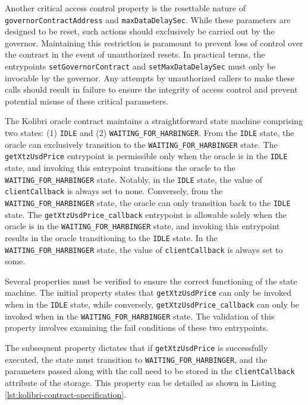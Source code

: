 \documentclass[a4paper,USenglish,cleveref, autoref, thm-restate]{lipics-v2021}
\begin{document}
Another critical access control property is the resettable nature of \lstinline/governorContractAddress/ and \lstinline/maxDataDelaySec/. While these parameters are designed to be reset, such actions should exclusively be carried out by the governor. Maintaining this restriction is paramount to prevent loss of control over the contract in the event of unauthorized resets. In practical terms, the entrypoints \lstinline/setGovernorContract/ and \lstinline/setMaxDataDelaySec/ must only be invocable by the governor. Any attempts by unauthorized callers to make these calls should result in failure to ensure the integrity of access control and prevent potential misuse of these critical parameters.

The Kolibri oracle contract maintains a straightforward state machine comprising two states: (1) \lstinline/IDLE/ and (2) \lstinline/WAITING_FOR_HARBINGER/. From the \lstinline/IDLE/ state, the oracle can exclusively transition to the \lstinline/WAITING_FOR_HARBINGER/ state. The \lstinline/getXtzUsdPrice/ entrypoint is permissible only when the oracle is in the \lstinline/IDLE/ state, and invoking this entrypoint transitions the oracle to the \lstinline/WAITING_FOR_HARBINGER/ state. Notably, in the \lstinline/IDLE/ state, the value of \lstinline/clientCallback/ is always set to none. Conversely, from the \lstinline/WAITING_FOR_HARBINGER/ state, the oracle can only transition back to the \lstinline/IDLE/ state. The \lstinline/getXtzUsdPrice_callback/ entrypoint is allowable solely when the oracle is in the \lstinline/WAITING_FOR_HARBINGER/ state, and invoking this entrypoint results in the oracle transitioning to the \lstinline/IDLE/ state. In the \lstinline/WAITING_FOR_HARBINGER/ state, the value of \lstinline/clientCallback/ is always set to some.

Several properties must be verified to ensure the correct functioning of the state machine. The initial property states that \lstinline/getXtzUsdPrice/ can only be invoked when in the \lstinline/IDLE/ state, while conversely, \lstinline/getXtzUsdPrice_callback/ can only be invoked when in the \lstinline/WAITING_FOR_HARBINGER/ state. The validation of this property involves examining the fail conditions of these two entrypoints.

The subsequent property dictates that if \lstinline/getXtzUsdPrice/ is successfully executed, the state must transition to \lstinline/WAITING_FOR_HARBINGER/, and the parameters passed along with the call need to be stored in the \lstinline/clientCallback/ attribute of the storage. This property can be detailed as shown in Listing \ref{lst:kolibri-contract-specification}.
\end{document}

